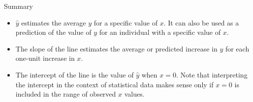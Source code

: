 \documentclass[Lecture.tex]{subfiles}
\begin{document}
\begin{frame}{Summary}
\begin{itemize}
\item<1->
$\hat y$ estimates the average $y$ for a specific value of $x$.  It can also be used as a prediction of the value of $y$ for an individual with a specific value of $x$.
\item<2->
The slope of the line estimates the average or predicted increase in $y$ for each one-unit increase in $x$.
\item<3->
The intercept of the line is the value of $\hat y$ when $x=0$.  Note that interpreting the intercept in the context of statistical data makes sense only if $x=0$ is included in the range of observed $x$ values.
\end{itemize}
\end{frame}  
  
  
  
  
  
  
  
  
\end{document}
